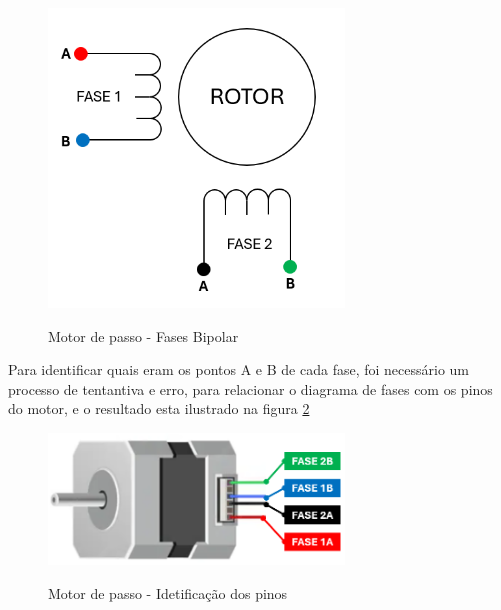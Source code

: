 \begin{figure}[htb]
	\centering
	\caption{Motor de passo - Fases Bipolar \cite{motor_dc_6v_encoder}}
	\includegraphics[width=0.7\textwidth]{figures/motor_wiring}
	\label{Especificacoes_motordc_6v}
\end{figure}

Para identificar quais eram os pontos A e B de cada fase, foi necessário um processo de tentantiva e erro,
para relacionar o diagrama de fases com os pinos do motor, e o resultado esta ilustrado na figura \ref{nema_pinout}

\begin{figure}[htb]
	\centering
	\caption{Motor de passo - Idetificação dos pinos}
	\includegraphics[width=0.7\textwidth]{figures/motor_pinout}
	\label{nema_pinout}
\end{figure}
